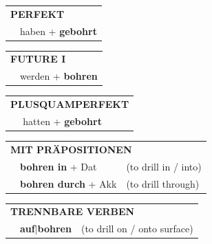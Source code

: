 \documentclass[10pt,a4paper]{revtex4-2}
\begin{document}
\begin{verbbox}
\vspace{10pt}

\begin{tabular}{rl}
\multicolumn{2}{l}{\textbf{PERFEKT}}\\
& haben + \textbf{gebohrt}\\
\end{tabular}
\hfill
\begin{tabular}{rl}
\multicolumn{2}{l}{\textbf{FUTURE I}}\\
& werden + \textbf{bohren}\\
\end{tabular}
\hfill
\begin{tabular}{rl}
\multicolumn{2}{l}{\textbf{PLUSQUAMPERFEKT}}\\
& hatten + \textbf{gebohrt}\\
\end{tabular}

\vspace{10pt}

\begin{tabular}{lll}
\multicolumn{3}{l}{\textbf{MIT PRÄPOSITIONEN}}\\
& \textbf{bohren in} + Dat & (to drill in / into)\\
& \textbf{bohren durch} + Akk & (to drill through)\\
\end{tabular}
\hfill
\begin{tabular}{lll}
\multicolumn{3}{l}{\textbf{TRENNBARE VERBEN}}\\
& \textbf{auf$|$bohren} & (to drill on / onto surface)\\
\end{tabular}
\vspace{-5pt}
\end{verbbox}
\end{document}
